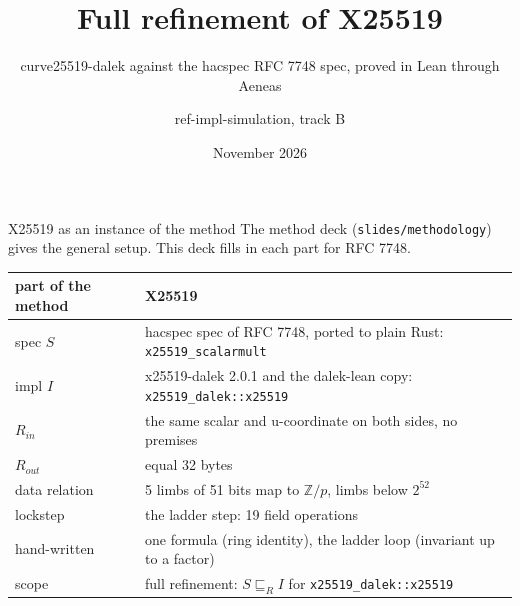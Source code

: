 \documentclass[aspectratio=169,11pt]{beamer}
\title{Full refinement of X25519}
\subtitle{curve25519-dalek against the hacspec RFC 7748 spec, proved in Lean through Aeneas}
\author{ref-impl-simulation, track B}
\date{November 2026}
\newcommand{\code}[1]{\texttt{#1}}
\newcommand{\refside}[1]{\textcolor{refc}{#1}}
\newcommand{\realside}[1]{\textcolor{realc}{#1}}
\newcommand{\refines}{\sqsubseteq}
\begin{document}
\begin{frame}
  \titlepage
  \centering
\end{frame}

\begin{frame}{X25519 as an instance of the method}
  The method deck (\code{slides/methodology}) gives the general setup. This deck fills
  in each part for RFC 7748.
  \vspace{1em}

  \centering
  \scriptsize
  \renewcommand{\arraystretch}{1.4}
  \begin{tabular}{l l}
    \textbf{part of the method} & \textbf{X25519} \\
    \hline
    \refside{spec $S$} & hacspec spec of RFC 7748, ported to plain Rust: \code{x25519\_scalarmult} \\
    \realside{impl $I$} & x25519-dalek 2.0.1 and the dalek-lean copy: \code{x25519\_dalek::x25519} \\
    $R_{in}$ & the same scalar and u-coordinate on both sides, no premises \\
    $R_{out}$ & equal 32 bytes \\
    data relation & 5 limbs of 51 bits map to $\mathbb{Z}/p$, limbs below $2^{52}$ \\
    lockstep & the ladder step: 19 field operations \\
    hand-written & one formula (ring identity), the ladder loop (invariant up to a factor) \\
    scope & full refinement: $S \refines_R I$ for \code{x25519\_dalek::x25519} \\
  \end{tabular}
\end{frame}
\end{document}
